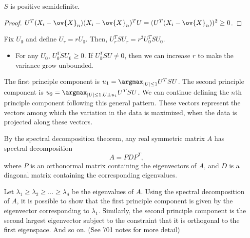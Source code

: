 \begin{theorem}
\claimlabel

$S$ is positive semidefinite.
\end{theorem}

\begin{proof}
$U^T(X_i-\ov{X}_n)(X_i-\ov{X}_n)^TU = (U^T(X_i-\ov{X}_n))^2\geq 0$. 
\end{proof}

Fix $U_0$ and define $U_r=rU_0$. Then, $U_r^TSU_r = r^2U_0^TSU_0$. 
\begin{itemize}
    \item For any $U_0$, $U_0^TSU_0\geq 0$. If $U_0^TSU\neq 0$, then we can increase $r$ to make the variance grow unbounded. 
\end{itemize}

The first principle component is $u_1 = \argmax_{\vert U\vert \leq 1}U^TSU$. The second principle component is $u_2 = \argmax_{\vert U\vert\leq 1, U\perp u_1} U^TSU$. We can continue defining the $n$th principle component following this general pattern. These vectors represent the vectors among which the variation in the data is maximized, when the data is projected along these vectors. 

\begin{theorem}
\thmlabel

By the spectral decomposition theorem, any real symmetric matrix $A$ has spectral decomposition 
\[A = PDP^T,\]
where $P$ is an orthonormal matrix containing the eigenvectors of $A$, and $D$ is a diagonal matrix containing the corresponding eigenvalues. 
\end{theorem}

Let $\lambda_1\geq \lambda_2\geq \hdots \geq \lambda_d$ be the eigenvalues of $A$. Using the spectral decomposition of $A$, it is possible to show that the first principle component is given by the eigenvector corresponding to $\lambda_1$. Similarly, the second principle component is the second largest eigenvector subject to the constraint that it is orthogonal to the first eigenspace. And so on.  (See 701 notes for more detail)